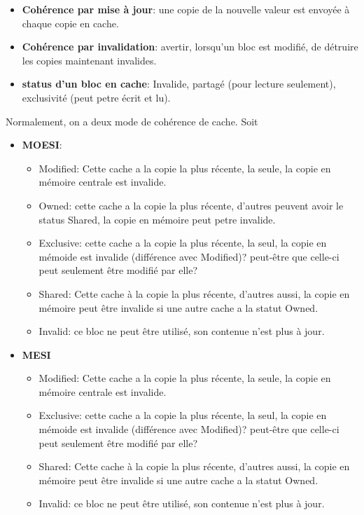 \documentclass[oneside]{book}
\begin{document}
\begin{itemize}
\item \textbf{Cohérence par mise à jour}: une copie de la nouvelle valeur est envoyée à chaque copie en cache.
\item \textbf{Cohérence par invalidation}: avertir, lorsqu'un bloc est modifié, de détruire les copies maintenant invalides.
\item \textbf{status d'un bloc en cache}: Invalide, partagé (pour lecture seulement), exclusivité (peut petre écrit et lu).
\end{itemize}
Normalement, on a deux mode de cohérence de cache. Soit
\begin{itemize}
\item \textbf{MOESI}:\\
\begin{itemize}
\item Modified: Cette cache a la copie la plus récente, la seule, la copie en mémoire centrale est invalide.
\item Owned: cette cache a la copie la plus récente, d'autres peuvent avoir le status Shared, la copie en mémoire peut petre invalide.
\item Exclusive: cette cache a la copie la plus récente, la seul, la copie en mémoide est invalide (différence avec Modified)? peut-être que celle-ci peut seulement être modifié par elle?
\item Shared: Cette cache à la copie la plus récente, d'autres aussi, la copie en mémoire peut être invalide si une autre cache a la statut Owned.
\item Invalid: ce bloc ne peut être utilisé, son contenue n'est plus à jour.
\end{itemize}
\item \textbf{MESI}
\begin{itemize}
\item Modified: Cette cache a la copie la plus récente, la seule, la copie en mémoire centrale est invalide.
\item Exclusive: cette cache a la copie la plus récente, la seul, la copie en mémoide est invalide (différence avec Modified)? peut-être que celle-ci peut seulement être modifié par elle?
\item Shared: Cette cache à la copie la plus récente, d'autres aussi, la copie en mémoire peut être invalide si une autre cache a la statut Owned.
\item Invalid: ce bloc ne peut être utilisé, son contenue n'est plus à jour.
\end{itemize}
\end{itemize}
\end{document}
